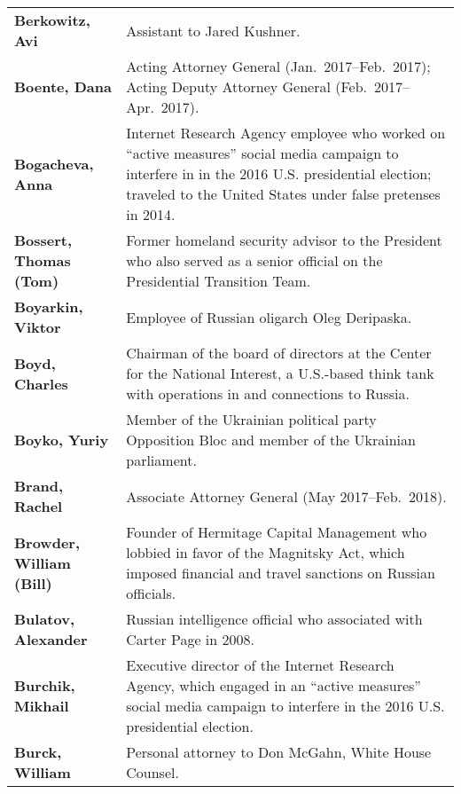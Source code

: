 \begin{longtable}{ p{} p{} }
    \textbf{Berkowitz, Avi} & Assistant to Jared Kushner. \\

    \textbf{Boente, Dana} & Acting Attorney General (Jan.~2017--Feb.~2017); Acting Deputy Attorney General (Feb.~2017--Apr.~2017). \\

    \textbf{Bogacheva, Anna} & Internet Research Agency employee who worked on ``active measures'' social media campaign to interfere in in the 2016 U.S. presidential election; traveled to the United States under false pretenses in 2014. \\

    \textbf{Bossert, Thomas (Tom)} & Former homeland security advisor to the President who also served as a senior official on the Presidential Transition Team. \\

    \textbf{Boyarkin, Viktor} & Employee of Russian oligarch Oleg Deripaska. \\

    \textbf{Boyd, Charles} & Chairman of the board of directors at the Center for the National Interest, a U.S.-based think tank with operations in and connections to Russia. \\

    \textbf{Boyko, Yuriy} & Member of the Ukrainian political party Opposition Bloc and member of the Ukrainian parliament. \\

    \textbf{Brand, Rachel} & Associate Attorney General (May 2017--Feb.~2018). \\

    \textbf{Browder, William (Bill)} & Founder of Hermitage Capital Management who lobbied in favor of the Magnitsky Act, which imposed financial and travel sanctions on Russian officials. \\

    \textbf{Bulatov, Alexander} & Russian intelligence official who associated with Carter Page in 2008. \\

    \textbf{Burchik, Mikhail} & Executive director of the Internet Research Agency, which engaged in an ``active measures'' social media campaign to interfere in the 2016 U.S. presidential election. \\

    \textbf{Burck, William} & Personal attorney to Don McGahn, White House Counsel. \\


\end{longtable}
